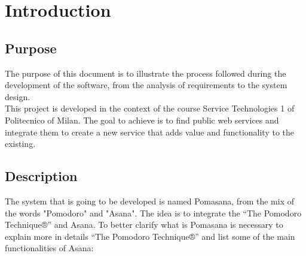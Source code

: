 


\chapter{Introduction}



	\section{Purpose}
	The purpose of this document is to illustrate the process followed during the development of the software, from the analysis of requirements to the system design.\\
	This project is developed in the context of the course Service Technologies 1 of Politecnico of Milan. The goal to achieve is to find public web services and integrate them to create a new service that adds value and functionality to the existing. 




	\section{Description}
	The system that is going to be developed is named Pomasana, from the mix of the words "Pomodoro" and "Asana".
	The idea is to integrate the “The Pomodoro Technique®” and Asana. To better clarify what is Pomasana is necessary to explain more in details “The Pomodoro Technique®” and list some of the main functionalities of Asana:\\

